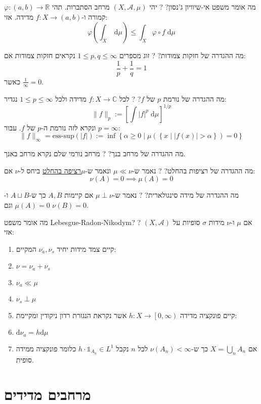 \documentclass{tstextbook}
\begin{document}
מה אומר משפט אי-שיוויון ג'נסון?
?
יהי \(\left( X,\mathcal{A},\mu \right)\) מרחב הסתברות. תהי \(\varphi:(a,b)\to \mathbb{R}\) קמורה ו-\(f:X\to (a,b)\) מדידה. אזי:
$$\varphi\left( \int _{X} \;\mathrm{d} \mu  \right)\leq \int _{X} \varphi \circ  f \;\mathrm{d} \mu $$

מה ההגדרה של חזקות צמודות?
?
זוג מספרים \(1\leq p,q\leq \infty\) נקראים חזקות צמודות אם:
$$\frac{1}{p}+\frac{1}{q}=1$$
כאשר \(\frac{1}{\infty}=0\).

מה ההגדרה של נורמת \(p\) של \(f\)?
?
לכל \(f:X\to \mathbb{C}\) מדידה ולכל \(1\leq p \leq \infty\) נגדיר:
$$\lVert f \rVert _{p} := \left[ \int  \lvert f \rvert ^{p} \;\mathrm{d} \mu  \right]^{1/p}$$
ונקרא לזה נורמת ה-\(p\) של \(f\). עבור \(p=\infty\):
$$\lVert f \rVert _{\infty}=\text{ess-sup}\left( \lvert f \rvert  \right):= \inf \left\{  \alpha \geq 0 \mid \mu\left( \left\{  x\mid \lvert f(x) \rvert >\alpha  \right\} \right)=0  \right\}$$

מה ההגדרה של מרחב בנך?
?
מרחב נורמי שלם נקרא מרחב באנך.

מה ההגדרה של רציפות בהחלט?
?
נאמר ש-\(\mu\ll \nu\)  ונאמר ש-\(\mu\)\underline{רציפה בהחלט} ביחס ל-\(\nu\) אם:
$$\nu(A)=0\implies \mu(A)=0$$

מה ההגדרה של מידה סינגולארית?
?
נאמר ש-\(\mu \perp \nu\) אם קיימות \(A,B\) כך ש-\(A\sqcup B\) ו-\(\mu(A)=0\) וגם \(\nu(B)=0\).

מה אומר משפט Lebesgue-Radon-Nikodym?
?
אם \(\mu\) ו-\(\nu\) מידות \(\sigma\) סופיות על \(\left( X,\mathcal{A} \right)\) אזי:

\begin{enumerate}
  \item קיים צמד מידות יחיד \(\nu_{a},\nu_{s}\) המקיים: 
  \item \(\nu=\nu_{a}+\nu_{s}\)
  \item \(\nu_{a}\ll \mu\)
  \item \(\nu_{s} \perp \mu\)


  \item קיים פונקציה מדידה \(h:X\to\left[ 0,\infty \right)\) אשר נקראת הנגזרת רדון ניקודין ומקיימת: 


  \item \(\mathrm{d}\nu_{a}=h\mathrm{d}\mu\)
  \item אם \(X=\bigcup_{n}A_{n}\) כך ש-\(\nu(A_{n})<\infty\) לכל \(n\) נקבל \(h\cdot \mathbb{1}_{A_{n}}\in L^{1}\) כלומר פונקציה ממידה סופית.
\end{enumerate}
\section{מרחבים מדידים}
\end{document}

